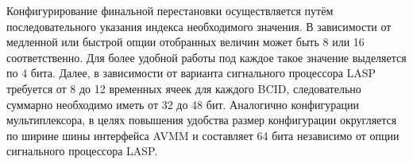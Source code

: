 Конфигурирование финальной перестановки осуществляется путём последовательного указания индекса необходимого значения. В зависимости от медленной или быстрой опции отобранных величин может быть 8 или 16 соответственно. Для более удобной работы под каждое такое значение выделяется по 4 бита. Далее, в зависимости от варианта сигнального процессора LASP требуется от 8 до 12 временных ячеек для каждого BCID, следовательно суммарно необходимо иметь от 32 до 48 бит. Аналогично конфигурации мультиплексора, в целях повышения удобства размер конфигурации округляется по ширине шины интерфейса AVMM и составляет 64 бита независимо от опции сигнального процессора LASP.\par
